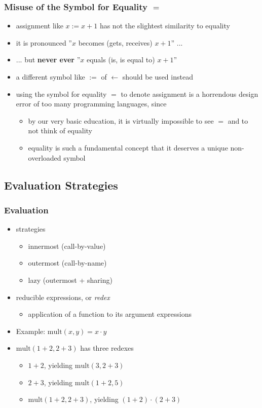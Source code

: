 \begin{multicols}{2}
\subsubsection{Misuse of the Symbol for Equality $=$}
\begin{itemize}
  \item assignment like $x := x + 1$ has not the slightest similarity to equality
  \item it is pronounced ''$x$ becomes (gets, receives) $x + 1$'' ...
  \item ... but \textbf{never ever} ''$x$ equals (is, is equal to) $x + 1$''
  \item a different symbol like $:=$ of $\leftarrow$ should be used instead
  \item using the symbol for equality $=$ to denote assignment is a horrendous design error of too many programming languages, since
  \begin{itemize}
    \item by our very basic education, it is virtually impossible to see $=$ and to not think of equality
    \item equality is such a fundamental concept that it deserves a unique non-overloaded symbol
  \end{itemize}
\end{itemize}

\subsection{Evaluation Strategies}
\subsubsection{Evaluation}
\begin{itemize}
  \item strategies
  \begin{itemize}
    \item innermost (call-by-value)
    \item outermost (call-by-name)
    \item lazy (outermost + sharing)
  \end{itemize}
  \item reducible expressions, or \textit{redex}
  \begin{itemize}
    \item application of a function to its argument expressions
  \end{itemize}
  \item Example: $\text{mult}(x, y) = x \cdot y$
  \item $\text{mult}(1 + 2, 2 + 3)$ has three redexes
  \begin{itemize}
    \item $1 + 2$, yielding $\text{mult}(3,2 + 3)$
    \item $2 + 3$, yielding $\text{mult}(1 + 2, 5)$
    \item $\text{mult}(1 + 2, 2 + 3)$, yielding $(1 + 2) \cdot (2 + 3)$
  \end{itemize}
\end{itemize}


\end{multicols}
